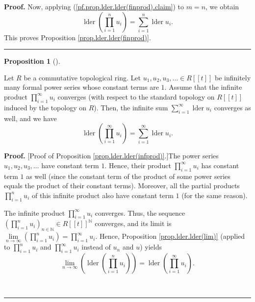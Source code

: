 \documentclass[numbers=enddot,12pt,final,onecolumn,notitlepage]{scrartcl}%
\theoremstyle{definition}
\newtheorem{prop}[theo]{Proposition}
\newenvironment{proposition}[1][]
{\begin{prop}[#1]\begin{leftbar}}
{\end{leftbar}\end{prop}}
\newenvironment{proof}[1][Proof]{\noindent\textbf{#1.} }{\ \rule{0.5em}{0.5em}}
\let\sumnonlimits\sum
\let\prodnonlimits\prod
\renewcommand{\sum}{\sumnonlimits\limits}
\renewcommand{\prod}{\prodnonlimits\limits}
\newenvironment{verlong}{}{}
\begin{document}
\begin{verlong}
\begin{proof}
Now, applying (\ref{pf.prop.lder.lder(finprod).claim}) to $m=n$, we obtain
\[
\operatorname*{lder}\left(  \prod_{i=1}^{n}u_{i}\right)  =\sum_{i=1}%
^{n}\operatorname*{lder}u_{i}.
\]
This proves Proposition \ref{prop.lder.lder(finprod)}.
\end{proof}

\begin{proposition}
\label{prop.lder.lder(infprod)}Let $R$ be a commutative topological ring. Let
$u_{1},u_{2},u_{3},\ldots\in R\left[  \left[  t\right]  \right]  $ be
infinitely many formal power series whose constant terms are $1$. Assume that
the infinite product $\prod_{i=1}^{\infty}u_{i}$ converges (with respect to
the standard topology on $R\left[  \left[  t\right]  \right]  $ induced by the
topology on $R$). Then, the infinite sum $\sum_{i=1}^{\infty}%
\operatorname*{lder}u_{i}$ converges as well, and we have%
\begin{equation}
\operatorname*{lder}\left(  \prod_{i=1}^{\infty}u_{i}\right)  =\sum
_{i=1}^{\infty}\operatorname*{lder}u_{i}.
\label{eq.prop.lder.lder(infprod).eq}%
\end{equation}

\end{proposition}

\begin{proof}
[Proof of Proposition \ref{prop.lder.lder(infprod)}.]The power series
$u_{1},u_{2},u_{3},\ldots$ have constant term $1$. Hence, their product
$\prod_{i=1}^{\infty}u_{i}$ has constant term $1$ as well (since the constant
term of the product of some power series equals the product of their constant
terms). Moreover, all the partial products $\prod_{i=1}^{n}u_{i}$ of this
infinite product also have constant term $1$ (for the same reason).

The infinite product $\prod_{i=1}^{\infty}u_{i}$ converges. Thus, the sequence
$\left(  \prod_{i=1}^{n}u_{i}\right)  _{n\in\mathbb{N}}\in R\left[  \left[
t\right]  \right]  ^{\mathbb{N}}$ converges, and its limit is $\lim
\limits_{n\rightarrow\infty}\left(  \prod_{i=1}^{n}u_{i}\right)  =\prod
_{i=1}^{\infty}u_{i}$. Hence, Proposition \ref{prop.lder.lder(lim)} (applied
to $\prod_{i=1}^{n}u_{i}$ and $\prod_{i=1}^{\infty}u_{i}$ instead of $u_{n}$
and $u$) yields%
\begin{equation}
\lim\limits_{n\rightarrow\infty}\left(  \operatorname*{lder}\left(
\prod_{i=1}^{n}u_{i}\right)  \right)  =\operatorname*{lder}\left(  \prod
_{i=1}^{\infty}u_{i}\right)  . \label{pf.prop.lder.lder(infprod).1}%
\end{equation}



\end{proof}
\end{verlong}
\end{document}
